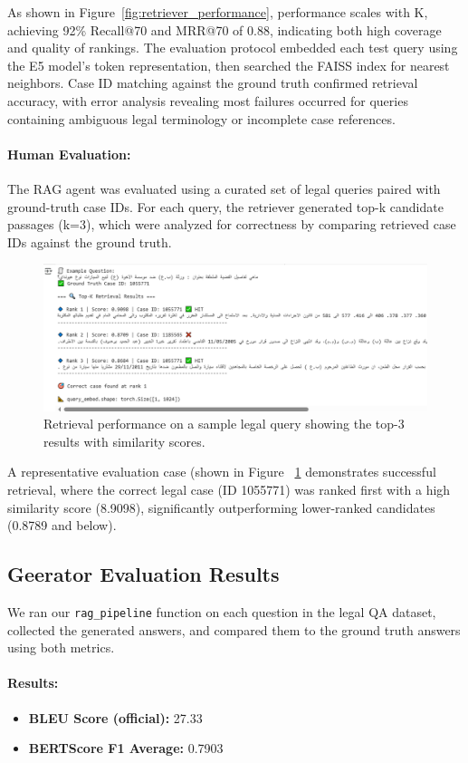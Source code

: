 As shown in Figure~\ref{fig:retriever_performance}, performance scales with K, achieving 92\% Recall@70 and MRR@70 of  0.88, indicating both high coverage and quality of rankings. The evaluation protocol embedded each test query using the E5 model's  token representation, then searched the FAISS index for nearest neighbors. Case ID matching against the ground truth confirmed retrieval accuracy, with error analysis revealing most failures occurred for queries containing ambiguous legal terminology or incomplete case references.
\paragraph{Human Evaluation:}
The RAG agent was evaluated using a curated set of legal queries paired with ground-truth case IDs. For each query, the retriever generated top-k candidate passages (k=3), which were analyzed for correctness by comparing retrieved case IDs against the ground truth.\\

\begin{figure}[h]
	\centering
	\includegraphics[width=0.8\linewidth]{Figures/testRs.png}
	\caption{Retrieval performance on a sample legal query showing the top-3 results with similarity scores. }
	\label{fig:retrieval_example}
\end{figure}
A representative  evaluation case (shown in Figure ~\ref{fig:retrieval_example} demonstrates successful retrieval, where the correct legal case (ID 1055771) was ranked first with a high similarity score (8.9098), significantly outperforming lower-ranked candidates (0.8789 and below).
\subsection{Geerator Evaluation Results }
We ran our \texttt{rag\_pipeline} function on each question in the legal QA dataset, collected the generated answers, and compared them to the ground truth answers using both metrics.

\paragraph{Results:}
\begin{itemize}
	\item \textbf{BLEU Score (official):} 27.33
	\item \textbf{BERTScore F1 Average:} 0.7903
\end{itemize}

